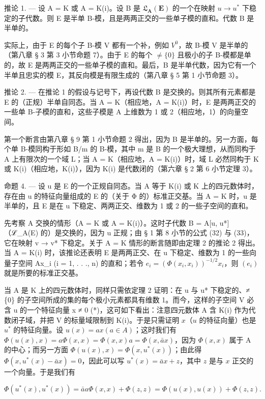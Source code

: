 推论 1. --- 设 A = K 或 A = K(i)。设 B 是 \(\mathfrak{L}_{\mathbf{A}}(\mathbf{E})\) 的一个在映射 \(u \to u^{*}\) 下稳定的子代数。则 E 是半单 B-模，且是两两正交的一些单子模的直和。代数 B 是半单的。

实际上，由于 E 的每个子 B-模 V 都有一个补，例如 \(V^{0}\)，故 B-模 V 是半单的（第八章 § 3 第 3 小节命题 7）。由于 E 的每个 \(\neq\{0\}\) 且极小的子 B-模都是单的，故 E 是两两正交的一些单子模的直和。最后，B 是半单代数，因为它有一个半单且忠实的模 E，其反向模是有限生成的（第八章 § 5 第 1 小节命题 3）。

推论 2. --- 在推论 1 的假设与记号下，再设代数 B 是交换的。则其所有元素都是 E 的（正规）半单自同态。当 A = K（相应地，A = K(i)）时，E 是两两正交的一些单 B-子模的直和，这些子模是 A 上维数为 1 或 2（相应地，1）的向量空间。

第一个断言由第八章 § 9 第 1 小节命题 2 得出，因为 B 是半单的。另一方面，每个单 B-模同构于形如 B/m 的 B-模，其中 m 是 B 的一个极大理想，从而同构于 A 上有限次的一个域 L；当 A = K（相应地，A = K(i)）时，域 L 必然同构于 K 或 K(i)（相应地，K(i)），因为 K(i) 是代数闭的（第六章 § 2 第 6 小节定理 3）。

命题 4. --- 设 u 是 E 的一个正规自同态。当 A 等于 K(i) 或 K 上的四元数体时，存在由 u 的特征向量组成的 E 的（关于 Φ 的）标准正交基。当 A = K 时，u 是半单的，且 E 是在 u 下稳定、两两正交、维数为 1 或 2 的一些子空间的直和。

先考察 A 交换的情形（A = K 或 A = K(i)）。这时子代数 B = A{[}u, u*{]}（ℒ\_A(E) 的）是交换的，因为 u 正规；由 § 1 第 8 小节的公式 (32) 与 (33)，它在映射 v → v* 下稳定。关于 A = K 情形的断言随即由定理 2 的推论 2 得出。当 A = K(i) 时，该推论还表明 E 是两两正交、在 u 下稳定、维数为 1 的一些向量子空间 Ax\_i (i = 1, . . ., n) 的直和；若令 \(e_{i} = (\Phi(x_{i}, x_{i}))^{-1/2}x_{i}\)，则 \((e_{i})\) 就是所要的标准正交基。

当 A 是 K 上的四元数体时，同样只需依定理 2 证明：在 u 与 u* 下稳定的、≠ \{0\} 的子空间所成的集的每个极小元素都具有维数 1。而今，这样的子空间 V 必含 u 的一个特征向量 x ≠ 0 (*)，这可如下看出：注意四元数体 A 含 K(i) 作为代数闭子域，并把 V 的标量域限制到 K(i)。于是只需证明 \(x\)（\(u\) 的特征向量）也是 \(u^{*}\) 的特征向量。设 \(u(x) = ax (a \in A)\)；这时我们有 \(\Phi(u(x), x) = a\Phi(x, x) = \Phi(x, x)a = \Phi(x, \bar{a}x)\)，因为 \(\Phi(x, x)\) 属于 A 的中心；而另一方面 \(\Phi(u(x), x) = \Phi(x, u^*(x))\)；由此得 \(\Phi(x, u^*(x) - \bar{a}x) = 0\)，因此可以写 \(u^*(x) = \bar{a}x + z\)，其中 \(z\) 是与 \(x\) 正交的一个向量。于是我们有

\[
\Phi (u ^ {*} (x), u ^ {*} (x)) = \bar {a} a \Phi (x, x) + \Phi (z, z) = \Phi (u (x), u (x)) + \Phi (z, z).
\]

